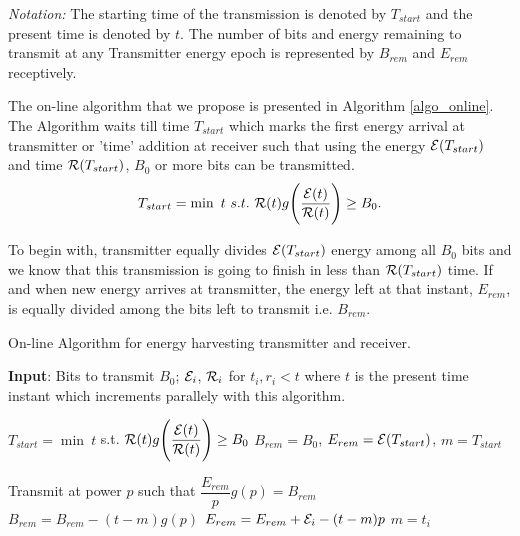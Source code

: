 \textit{Notation:} The starting time of the transmission is denoted by $T_{start}$ and the present time is denoted by $t$. The number of bits and energy remaining to transmit at any Transmitter energy epoch is represented by $B_{rem}$ and $E_{rem}$ receptively.

The on-line algorithm that we propose is presented in Algorithm \ref{algo_online}. The Algorithm waits till time $T_{start}$ which marks the first energy arrival at transmitter or 'time' addition at receiver such that using the energy $\mathcal{E}(T_{start})$ and time $\mathcal{R}(T_{start})$, $B_0$ or more bits can be transmitted.
\begin{equation}
T_{start}=\min\ t \ s.t.\  \TRx(t)g\Bigg{(} \dfrac{\ETx(t)}{\TRx(t)}\Bigg{)}\ge B_0.\label{online_T_start}
\end{equation}

To begin with, transmitter equally divides $\mathcal{E}(T_{start})$ energy among all $B_0$ bits and we know that this transmission is going to finish in less than $\mathcal{R}(T_{start})$ time. If and when new energy arrives at transmitter, the energy left at that instant, $E_{rem}$, is equally divided among the bits left to transmit i.e. $B_{rem}$.

\begin{algorithm}
\caption {On-line Algorithm for energy harvesting transmitter and receiver.}
\footnotesize
\label{algo_online}
\begin{algorithmic}[1]
\State \textbf{Input}: Bits to transmit $B_0$; $\mathcal{E}_i$, $\mathcal{R}_i$ for $t_i,r_i<t$ where $t$ is the present time instant which increments parallely with this algorithm. 

\State $T_{start}=\min\ t$ s.t. $\mathcal{R}(t)g\Bigg{(} \dfrac{\mathcal{E}(t)}{\mathcal{R}(t)}\Bigg{)}\ge B_0$
\State $B_{rem}=B_0$, $E_{rem}=\mathcal{E}(T_{start})$, $m=T_{start}$

\Do
	\State Transmit at power $p$ such that $\dfrac{E_{rem}}{p} g(p)= B_{rem}$
		\State $B_{rem}=B_{rem}-(t-m)g(p)$
		\State $E_{rem}=E_{rem}+\mathcal{E}_i-(t-m)p$
		\State $m=t_i$
	\EndIf
{}
\end{algorithmic}
\end{algorithm}

